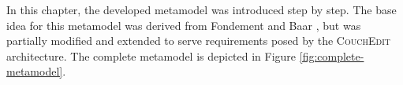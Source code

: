 
In this chapter, the developed metamodel was introduced step by step. The base idea for this metamodel was derived from Fondement and Baar \cite{fondement_making_2005}, but was partially modified and extended to serve requirements posed by the \textsc{CouchEdit} architecture. The complete metamodel is depicted in Figure \ref{fig:complete-metamodel}.